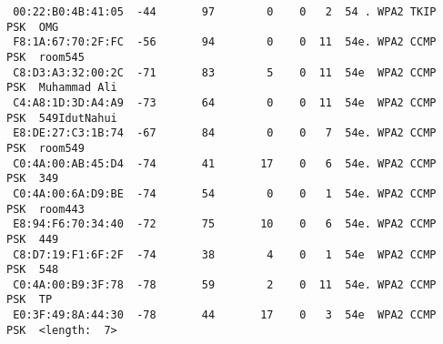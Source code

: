 \documentclass[10pt,a4paper]{article}
\begin{document}
\begin{itemize}
\begin{lstlisting}
 00:22:B0:4B:41:05  -44       97        0    0   2  54 . WPA2 TKIP   PSK  OMG                                                                                                                                                               
 F8:1A:67:70:2F:FC  -56       94        0    0  11  54e. WPA2 CCMP   PSK  room545                                                                                                                                                           
 C8:D3:A3:32:00:2C  -71       83        5    0  11  54e  WPA2 CCMP   PSK  Muhammad Ali                                                                                                                                                      
 C4:A8:1D:3D:A4:A9  -73       64        0    0  11  54e  WPA2 CCMP   PSK  549IdutNahui                                                                                                                                                      
 E8:DE:27:C3:1B:74  -67       84        0    0   7  54e. WPA2 CCMP   PSK  room549                                                                                                                                                           
 C0:4A:00:AB:45:D4  -74       41       17    0   6  54e. WPA2 CCMP   PSK  349                                                                                                                                                               
 C0:4A:00:6A:D9:BE  -74       54        0    0   1  54e. WPA2 CCMP   PSK  room443                                                                                                                                                           
 E8:94:F6:70:34:40  -72       75       10    0   6  54e. WPA2 CCMP   PSK  449                                                                                                                                                               
 C8:D7:19:F1:6F:2F  -74       38        4    0   1  54e  WPA2 CCMP   PSK  548                                                                                                                                                                
 C0:4A:00:B9:3F:78  -78       59        2    0  11  54e. WPA2 CCMP   PSK  TP                                                                                                                                                                 
 E0:3F:49:8A:44:30  -78       44       17    0   3  54e  WPA2 CCMP   PSK  <length:  7>                                                                                                                                                      

\end{lstlisting}
\end{itemize}
\end{document}
